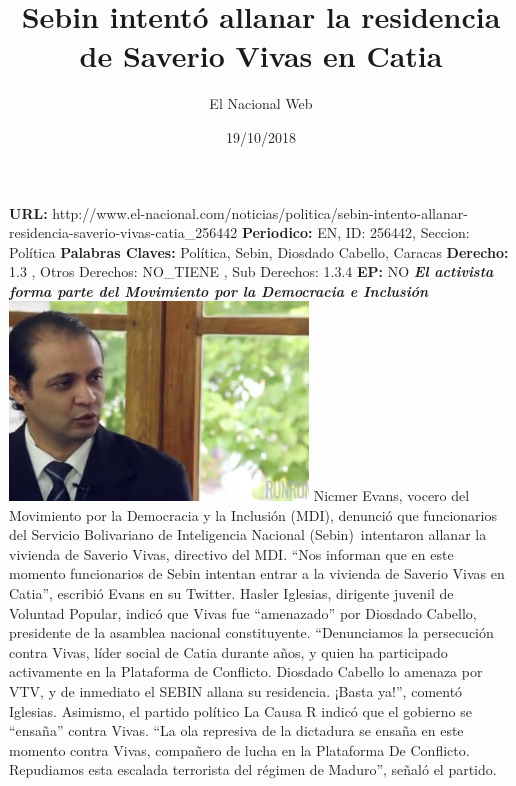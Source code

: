 \documentclass{article}%
\title{\textbf{Sebin intentó allanar la residencia de Saverio Vivas en Catia}}%
\author{El Nacional Web}%
\date{19/10/2018}%
\begin{document}
%
\normalsize%
\maketitle%
\textbf{URL: }%
http://www.el{-}nacional.com/noticias/politica/sebin{-}intento{-}allanar{-}residencia{-}saverio{-}vivas{-}catia\_256442\newline%
%
\textbf{Periodico: }%
EN, %
ID: %
256442, %
Seccion: %
Política\newline%
%
\textbf{Palabras Claves: }%
Política, Sebin, Diosdado Cabello, Caracas\newline%
%
\textbf{Derecho: }%
1.3%
, Otros Derechos: %
NO\_TIENE%
, Sub Derechos: %
1.3.4%
\newline%
%
\textbf{EP: }%
NO\newline%
\newline%
%
\textbf{\textit{El activista forma parte del Movimiento por la Democracia e Inclusión~}}%
\newline%
\newline%
%
\includegraphics[width=300px]{175.jpg}%
\newline%
%
Nicmer Evans, vocero del Movimiento por la Democracia y la Inclusión (MDI), denunció que funcionarios del Servicio Bolivariano de Inteligencia Nacional (Sebin)~intentaron allanar la vivienda de Saverio Vivas, directivo del MDI.%
\newline%
%
“Nos informan que en este momento funcionarios de Sebin intentan entrar a la vivienda de Saverio Vivas en Catia”, escribió Evans en su Twitter.%
\newline%
%
Hasler Iglesias, dirigente juvenil de Voluntad Popular, indicó que Vivas fue “amenazado” por Diosdado Cabello, presidente de la asamblea nacional constituyente.%
\newline%
%
“Denunciamos la persecución contra Vivas, líder social de Catia durante años, y quien ha participado activamente en la Plataforma de Conflicto. Diosdado Cabello lo amenaza por VTV, y de inmediato el SEBIN allana su residencia. ¡Basta ya!”, comentó Iglesias.%
\newline%
%
Asimismo, el partido político La Causa R indicó que el gobierno se “ensaña” contra Vivas.%
\newline%
%
“La ola represiva de la dictadura se ensaña en este momento contra Vivas, compañero de lucha en la Plataforma De Conflicto. Repudiamos esta escalada terrorista del régimen de Maduro”, señaló el partido.%
\newline%
%
\end{document}
